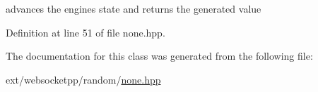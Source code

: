 advances the engine\textquotesingle{}s state and returns the generated value 



Definition at line 51 of file none.\+hpp.



The documentation for this class was generated from the following file\+:\begin{DoxyCompactItemize}
\item 
ext/websocketpp/random/\hyperlink{random_2none_8hpp}{none.\+hpp}\end{DoxyCompactItemize}
